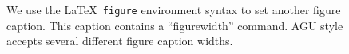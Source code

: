 \begin{figure}
\figurewidth{35pc}
\caption{We use the \LaTeX\ {\tt figure} environment syntax to set another
figure caption.  This caption contains a ``figurewidth'' command.  AGU style
accepts several different figure caption widths.}
\end{figure}

\begin{plate}
\platewidth{35pc}
\caption{We use the AGU\TeX\ {\tt plate} environment syntax to set a
plate caption.  This caption contains a ``platewidth'' command.  AGU style
accepts several different plate caption widths.}
\end{plate}



